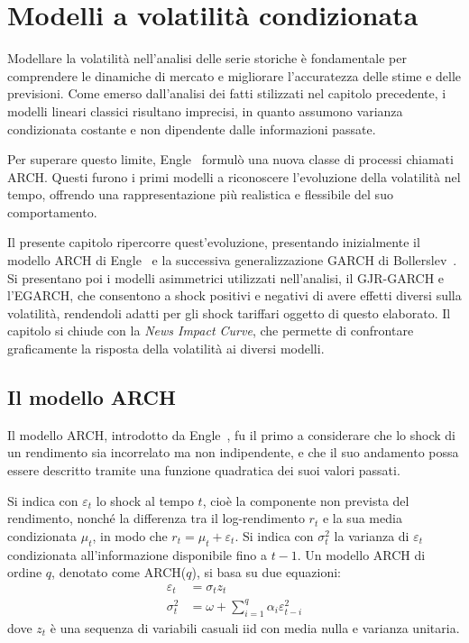 \chapter{Modelli a volatilità condizionata}
\label{cap:volatilita-condizionata}

Modellare la volatilità nell'analisi delle serie storiche è fondamentale per comprendere le dinamiche di mercato e migliorare l'accuratezza delle stime e delle previsioni.
Come emerso dall'analisi dei fatti stilizzati nel capitolo precedente, i modelli lineari classici risultano imprecisi, in quanto assumono varianza condizionata costante e non dipendente dalle informazioni passate.

Per superare questo limite, Engle~\cite{engle:arch} formulò una nuova classe di processi chiamati ARCH. Questi furono i primi modelli a riconoscere l'evoluzione della volatilità nel tempo, offrendo una rappresentazione più realistica e flessibile del suo comportamento.

Il presente capitolo ripercorre quest'evoluzione, presentando inizialmente il modello ARCH di Engle~\cite{engle:arch} e la successiva generalizzazione GARCH di Bollerslev~\cite{bollerslev:garch}. 
Si presentano poi i modelli asimmetrici utilizzati nell'analisi, il GJR-GARCH e l'EGARCH, che consentono a shock positivi e negativi di avere effetti diversi sulla volatilità, rendendoli adatti per gli shock tariffari oggetto di questo elaborato. Il capitolo si chiude con la \emph{News Impact Curve}, che permette di confrontare graficamente la risposta della volatilità ai diversi modelli.

\section{Il modello ARCH}
\label{sec:modello-arch}
Il modello ARCH, introdotto da Engle~\cite{engle:arch}, fu il primo a considerare che lo shock di un rendimento sia incorrelato ma non indipendente, e che il suo andamento possa essere descritto tramite una funzione quadratica dei suoi valori passati.

Si indica con $\varepsilon_t$ lo shock al tempo $t$, cioè la componente non prevista del rendimento, nonché la differenza tra il log-rendimento $r_t$ e la sua media condizionata $\mu_t$, in modo che $r_t = \mu_t + \varepsilon_t$. 
Si indica con $\sigma_t^2$ la varianza di $\varepsilon_t$ condizionata all'informazione disponibile fino a $t-1$. Un modello ARCH di ordine $q$, denotato come ARCH($q$), si basa su due equazioni:
\begin{align*}
    \varepsilon_t &= \sigma_t z_t \\
    \sigma_t^2 &= \omega + \sum_{i=1}^q \alpha_i \varepsilon_{t-i}^2
\end{align*}
dove $z_t$ è una sequenza di variabili casuali \gls{iid} con media nulla e varianza unitaria.

